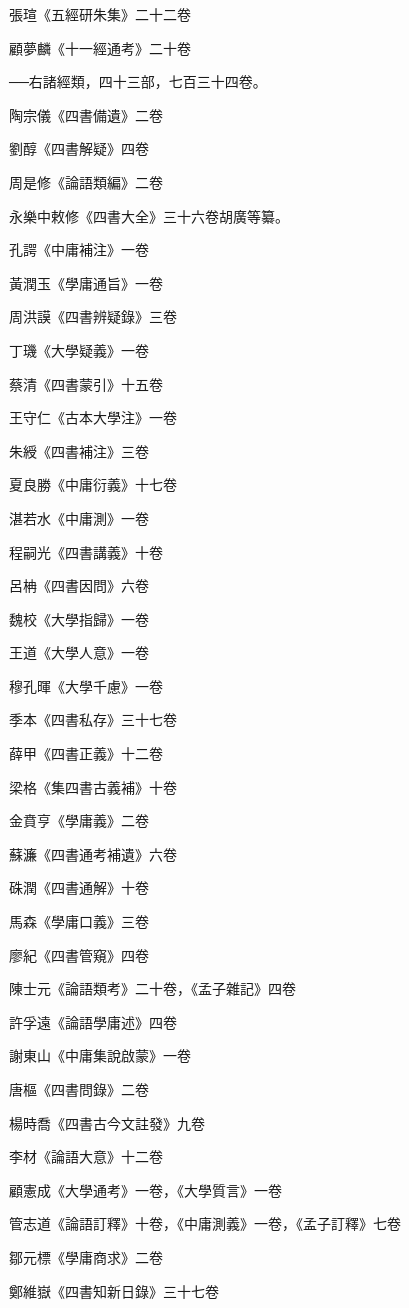張瑄《五經研朱集》二十二卷

顧夢麟《十一經通考》二十卷

──右諸經類，四十三部，七百三十四卷。

陶宗儀《四書備遺》二卷

劉醇《四書解疑》四卷

周是修《論語類編》二卷

永樂中敕修《四書大全》三十六卷胡廣等纂。

孔諤《中庸補注》一卷

黃潤玉《學庸通旨》一卷

周洪謨《四書辨疑錄》三卷

丁璣《大學疑義》一卷

蔡清《四書蒙引》十五卷

王守仁《古本大學注》一卷

朱綬《四書補注》三卷

夏良勝《中庸衍義》十七卷

湛若水《中庸測》一卷

程嗣光《四書講義》十卷

呂柟《四書因問》六卷

魏校《大學指歸》一卷

王道《大學人意》一卷

穆孔暉《大學千慮》一卷

季本《四書私存》三十七卷

薛甲《四書正義》十二卷

梁格《集四書古義補》十卷

金賁亨《學庸義》二卷

蘇濂《四書通考補遺》六卷

硃潤《四書通解》十卷

馬森《學庸口義》三卷

廖紀《四書管窺》四卷

陳士元《論語類考》二十卷，《孟子雜記》四卷

許孚遠《論語學庸述》四卷

謝東山《中庸集說啟蒙》一卷

唐樞《四書問錄》二卷

楊時喬《四書古今文註發》九卷

李材《論語大意》十二卷

顧憲成《大學通考》一卷，《大學質言》一卷

管志道《論語訂釋》十卷，《中庸測義》一卷，《孟子訂釋》七卷

鄒元標《學庸商求》二卷

鄭維嶽《四書知新日錄》三十七卷

